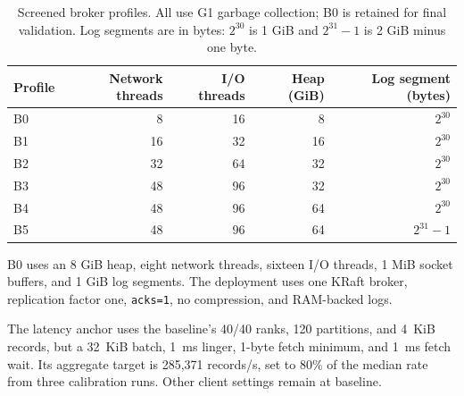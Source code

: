 \documentclass[10pt]{article}
\begin{document}
\begin{table}[H]
\centering
\small
\setlength{\tabcolsep}{9pt}
\begin{tabular}{@{}lrrrr@{}}
\toprule
Profile & Network threads & I/O threads & Heap (GiB) & Log segment (bytes) \\
\midrule
B0 & 8 & 16 & 8 & $2^{30}$ \\
B1 & 16 & 32 & 16 & $2^{30}$ \\
B2 & 32 & 64 & 32 & $2^{30}$ \\
B3 & 48 & 96 & 32 & $2^{30}$ \\
B4 & 48 & 96 & 64 & $2^{30}$ \\
B5 & 48 & 96 & 64 & $2^{31}-1$ \\
\bottomrule
\end{tabular}
\caption{Screened broker profiles. All use G1 garbage collection; B0 is retained
for final validation. Log segments are in bytes: $2^{30}$ is 1 GiB and
$2^{31}-1$ is 2 GiB minus one byte.}
\label{tab:broker-profiles}
\end{table}

B0 uses an 8 GiB heap, eight network threads, sixteen I/O threads, 1 MiB socket
buffers, and 1 GiB log segments. The deployment uses one KRaft broker,
replication factor one, \texttt{acks=1}, no compression, and RAM-backed logs.

The latency anchor uses the baseline's 40/40 ranks, 120 partitions, and 4~KiB
records, but a 32~KiB batch, 1~ms linger, 1-byte fetch minimum, and 1~ms fetch
wait.  Its aggregate target is 285,371 records/s, set to 80\% of the median
rate from three calibration runs.  Other client settings remain at baseline.
\end{document}
